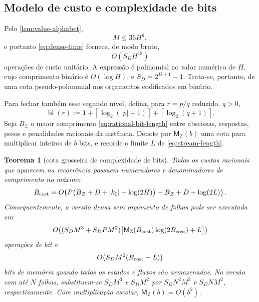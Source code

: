 \documentclass[11pt,a4paper]{article}
\newtheorem{theorem}{Teorema}[section]
\theoremstyle{definition}
\theoremstyle{remark}
\begin{document}
\subsection{Modelo de custo e complexidade de bits}

Pelo \cref{lem:value-alphabet},
\[
 M\le36H^6,
\]
e portanto \eqref{eq:dense-time} fornece, de modo bruto,
\begin{equation}
 O(S_DH^{18})
 \label{eq:height-worst}
\end{equation}
operações de custo unitário. A expressão é polinomial no valor numérico de
$H$, cujo comprimento binário é $O(\log H)$, e
$S_D=2^{D+1}-1$. Trata-se, portanto, de uma cota pseudo-polinomial nos
orçamentos codificados em binário.

Para fechar também esse segundo nível, defina, para $r=p/q$ reduzido, $q>0$,
\begin{equation}
 \operatorname{bl}(r)
 :=1+\left\lceil\log_2(|p|+1)\right\rceil
    +\left\lceil\log_2(q+1)\right\rceil .
 \label{eq:rational-bit-length}
\end{equation}
Seja $B_{\mathcal Z}$ o maior comprimento \eqref{eq:rational-bit-length}
entre abscissas, respostas, pesos e penalidades racionais da instância. Denote
por $\mathsf M_{\mathbb Z}(b)$ uma cota para multiplicar inteiros de $b$ bits,
e recorde o limite $L$ de \eqref{eq:stream-length}.

\begin{theorem}[cota grosseira de complexidade de bits]
\label{thm:bit-complexity}
Todos os custos racionais que aparecem na recorrência possuem numeradores e
denominadores de comprimento no máximo
\begin{equation}
 B_{\rm cost}
 =O\!\left(
 P\bigl(B_{\mathcal Z}+D+|k_0|+\log(2H)\bigr)
 +B_{\mathcal Z}+D+\log(2L)
 \right).
 \label{eq:cost-bit-growth}
\end{equation}
Consequentemente, a versão densa sem orçamento de folhas pode ser executada em
\begin{equation}
 O\!\left(
 (S_DM^3+S_DPM^2)
 \bigl[\mathsf M_{\mathbb Z}(B_{\rm cost})
       \log(2B_{\rm cost})+L\bigr]
 \right)
 \label{eq:dense-bit-time}
\end{equation}
operações de bit e
\begin{equation}
 O\!\left(S_DM^2(B_{\rm cost}+L)\right)
 \label{eq:dense-bit-memory}
\end{equation}
bits de memória quando todos os estados e fluxos são armazenados. Na versão
com até $N$ folhas, substituem-se $S_DM^3$ e $S_DM^2$ por
$S_DN^2M^3$ e $S_DNM^2$, respectivamente. Com multiplicação escolar,
$\mathsf M_{\mathbb Z}(b)=O(b^2)$.
\end{theorem}
\end{document}
